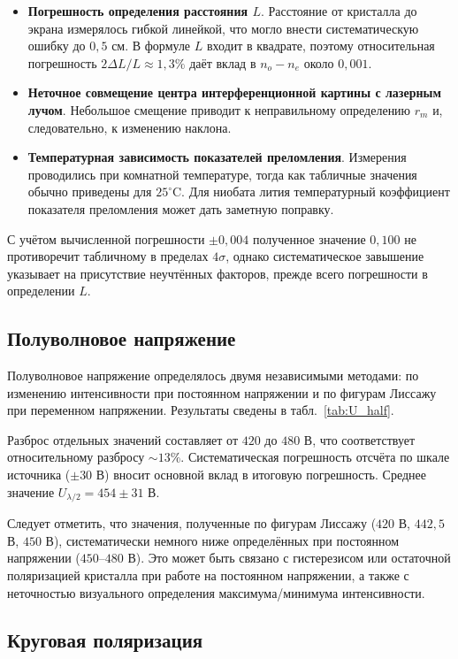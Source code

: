 \documentclass[a4paper]{article}
\begin{document}
\begin{itemize}
    \item \textbf{Погрешность определения расстояния $L$}. Расстояние от кристалла до экрана измерялось гибкой линейкой, что могло внести систематическую ошибку до $0,5$ см. В формуле $L$ входит в квадрате, поэтому относительная погрешность $2\Delta L/L \approx 1,3\%$ даёт вклад в $n_o-n_e$ около $0,001$.
    \item \textbf{Неточное совмещение центра интерференционной картины с лазерным лучом}. Небольшое смещение приводит к неправильному определению $r_m$ и, следовательно, к изменению наклона.
    \item \textbf{Температурная зависимость показателей преломления}. Измерения проводились при комнатной температуре, тогда как табличные значения обычно приведены для $25^\circ$C. Для ниобата лития температурный коэффициент показателя преломления может дать заметную поправку.
\end{itemize}

С учётом вычисленной погрешности $\pm 0,004$ полученное значение $0,100$ не противоречит табличному в пределах $4\sigma$, однако систематическое завышение указывает на присутствие неучтённых факторов, прежде всего погрешности в определении $L$.

\subsection*{Полуволновое напряжение}

Полуволновое напряжение определялось двумя независимыми методами: по изменению интенсивности при постоянном напряжении и по фигурам Лиссажу при переменном напряжении. Результаты сведены в табл.~\ref{tab:U_half}.

Разброс отдельных значений составляет от $420$ до $480$ В, что соответствует относительному разбросу $\sim 13\%$. Систематическая погрешность отсчёта по шкале источника ($\pm 30$ В) вносит основной вклад в итоговую погрешность. Среднее значение $U_{\lambda/2} = 454 \pm 31$ В.

Следует отметить, что значения, полученные по фигурам Лиссажу ($420$ В, $442,5$ В, $450$ В), систематически немного ниже определённых при постоянном напряжении ($450$–$480$ В). Это может быть связано с гистерезисом или остаточной поляризацией кристалла при работе на постоянном напряжении, а также с неточностью визуального определения максимума/минимума интенсивности.

\subsection*{Круговая поляризация}
\end{document}
